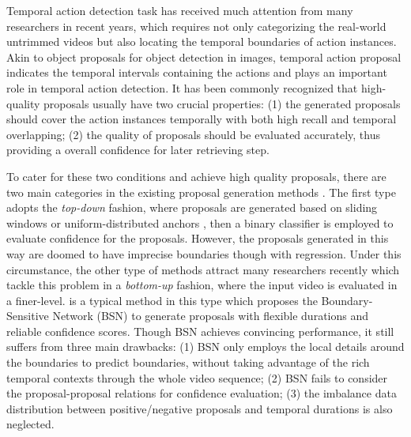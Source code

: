 \documentclass[letterpaper]{article} \usepackage{aaai21}  \usepackage{times}  \usepackage{helvet} \usepackage{courier}  \usepackage[hyphens]{url}  \usepackage{graphicx} \urlstyle{rm} \def\UrlFont{\rm}  \usepackage{natbib}  \usepackage{amsmath,amssymb} \usepackage{caption} \frenchspacing  \usepackage{color}
\begin{document}
Temporal action detection task has received much attention from many researchers in recent years, which requires not only categorizing the real-world untrimmed videos but also locating the temporal boundaries of action instances. Akin to object proposals for object detection in images, temporal action proposal indicates the temporal intervals containing the actions and plays an important role in temporal action detection. It has been commonly recognized that high-quality proposals usually have two crucial properties: (1) the generated proposals should cover the action instances temporally with both high recall and temporal overlapping; (2) the quality of proposals should be evaluated accurately, thus providing a overall confidence for later retrieving step.

To cater for these two conditions and achieve high quality proposals, there are two main categories in the existing proposal generation methods \cite{sst_buch_cvpr17,gao2017turn,SSAD,SCNN}. The first type adopts the \textit{top-down} fashion, where proposals are generated based on sliding windows \cite{SCNN} or uniform-distributed anchors \cite{SSAD}, then a binary classifier is employed to evaluate confidence for the proposals. 
However, the proposals generated in this way are doomed to have imprecise boundaries though with regression. Under this circumstance, the other type of methods \cite{BSN,Y.Xiong,LinBMN} attract many researchers recently which tackle this problem in a \textit{bottom-up} fashion, where the input video is evaluated in a finer-level. \cite{BSN} is a typical method in this type which proposes the Boundary-Sensitive Network (BSN) to generate proposals with flexible durations and reliable confidence scores. Though BSN achieves convincing performance, it still suffers from three main drawbacks: (1) BSN only employs the local details around the boundaries to predict boundaries, without taking advantage of the rich temporal contexts through the whole video sequence; (2) BSN fails to consider the proposal-proposal relations for confidence evaluation; (3) the imbalance data distribution between positive/negative proposals and temporal durations is also neglected.
\end{document}
